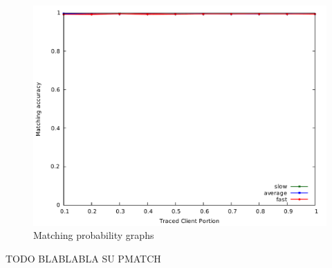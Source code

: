 \begin{figure}[H]
\includegraphics[scale=0.35]{graphs/c_tclient_pmatch.pdf}
\caption{Matching probability graphs}
\label{fig:g_pmatch}
\end{figure}

TODO BLABLABLA SU PMATCH

